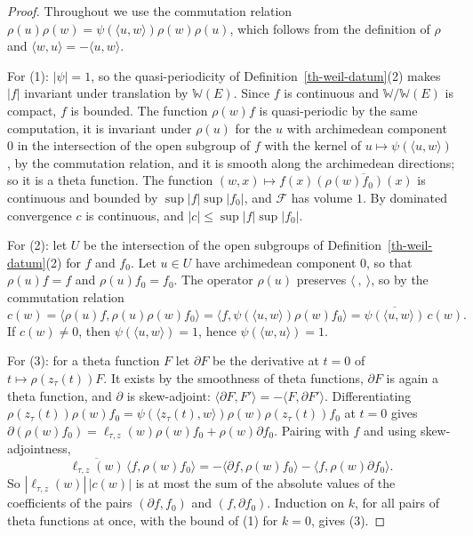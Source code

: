 \begin{proof}
Throughout we use the commutation relation
$\rho(u)\rho(w)=\psi(\langle u,w\rangle)\rho(w)\rho(u)$, which follows from
the definition of $\rho$ and $\langle w,u\rangle=-\langle u,w\rangle$.

For (1): $|\psi|=1$, so the quasi-periodicity of
Definition~\ref{th-weil-datum}(2) makes $|f|$ invariant under translation by
$\mathbb W(E)$. Since $f$ is continuous and $\mathbb W/\mathbb W(E)$ is
compact, $f$ is bounded. The function $\rho(w)f$ is quasi-periodic by the same
computation, it is invariant under $\rho(u)$ for the $u$ with archimedean
component $0$ in the intersection of the open subgroup of $f$ with the kernel
of $u\mapsto\psi(\langle u,w\rangle)$, by the commutation relation, and it is
smooth along the archimedean directions; so it is a theta function. The function
$(w,x)\mapsto f(x)\overline{(\rho(w)f_0)(x)}$ is continuous and bounded by
$\sup|f|\sup|f_0|$, and $\mathcal F$ has volume $1$. By dominated convergence
$c$ is continuous, and $|c|\leq\sup|f|\sup|f_0|$.

For (2): let $U$ be the intersection of the open subgroups of
Definition~\ref{th-weil-datum}(2) for $f$ and $f_0$. Let $u\in U$ have
archimedean component $0$, so that $\rho(u)f=f$ and $\rho(u)f_0=f_0$. The
operator $\rho(u)$ preserves $\langle\ ,\ \rangle$, so by the commutation
relation
\[
c(w)=\langle\rho(u)f,\rho(u)\rho(w)f_0\rangle
=\langle f,\psi(\langle u,w\rangle)\rho(w)f_0\rangle
=\overline{\psi(\langle u,w\rangle)}\,c(w).
\]
If $c(w)\neq0$, then $\psi(\langle u,w\rangle)=1$, hence
$\psi(\langle w,u\rangle)=1$.

For (3): for a theta function $F$ let $\partial F$ be the derivative at $t=0$
of $t\mapsto\rho(z_\tau(t))F$. It exists by the smoothness of theta functions,
$\partial F$ is again a theta function, and $\partial$ is skew-adjoint:
$\langle\partial F,F'\rangle=-\langle F,\partial F'\rangle$. Differentiating
$\rho(z_\tau(t))\rho(w)f_0=\psi(\langle z_\tau(t),w\rangle)\rho(w)\rho(z_\tau(t))f_0$
at $t=0$ gives
$\partial(\rho(w)f_0)=\ell_{\tau,z}(w)\rho(w)f_0+\rho(w)\partial f_0$. Pairing
with $f$ and using skew-adjointness,
\[
\overline{\ell_{\tau,z}(w)}\,\langle f,\rho(w)f_0\rangle
=-\langle\partial f,\rho(w)f_0\rangle-\langle f,\rho(w)\partial f_0\rangle .
\]
So $|\ell_{\tau,z}(w)|\,|c(w)|$ is at most the sum of the absolute values of the
coefficients of the pairs $(\partial f,f_0)$ and $(f,\partial f_0)$. Induction
on $k$, for all pairs of theta functions at once, with the bound of (1) for
$k=0$, gives (3).


\end{proof}
